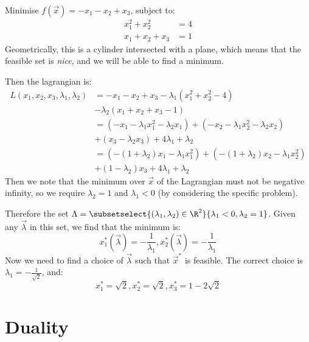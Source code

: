 \documentclass[../Main.tex]{subfiles}
\begin{document}
\begin{example}
    Minimise $f(\vec{x}) = -x_1 - x_2 + x_3$, subject to:
    \begin{align*}
        x_1^2 + x_2^2 &= 4 \\
        x_1 + x_2 + x_3 &= 1
    \end{align*}
    Geometrically, this is a cylinder intersected with a plane, which means that the feasible set is \textit{nice}, and we will be able to find a minimum.

    Then the lagrangian is:
    \begin{align*}
        L(x_1, x_2, x_3, \lambda_1, \lambda_2) &= -x_1 - x_2 + x_3 - \lambda_1(x_1^2 + x_2^2 - 4) \\
        &- \lambda_2(x_1 + x_2 + x_3 - 1) \\
        &= (-x_1 - \lambda_1 x_1^2 - \lambda_2 x_1) + (-x_2 - \lambda_1 x_2^2 - \lambda_2 x_2) \\
        &+(x_3 - \lambda_2 x_3) + 4\lambda_1 + \lambda_2 \\
        &= \left(-(1 + \lambda_2) x_1 - \lambda_1 x_1^2\right) + \left(-(1 + \lambda_2)x_2 - \lambda_1 x_2^2\right)\\
        &+ \left(1 - \lambda_2\right)x_3 + 4\lambda_1 + \lambda_2
    \end{align*}
    Then we note that the minimum over $\vec{x}$ of the Lagrangian must not be negative infinity, so we require $\lambda_2 = 1$ and $\lambda_1 < 0$ (by considering the specific problem).
    
    Therefore the set $\Lambda = \subsetselect{(\lambda_1, \lambda_2) \in \R^2}{\lambda_1 < 0, \lambda_2 = 1}$.
    Given any $\vec{\lambda}$ in this set, we find that the minimum is:
    \begin{equation*}
        x_1^*(\vec{\lambda}) = -\frac{1}{\lambda_1}, x_2^*(\vec{\lambda}) = -\frac{1}{\lambda_1}
    \end{equation*}
    Now we need to find a choice of $\vec{\lambda}$ such that $\vec{x}^*$ is feasible. The correct choice is $\lambda_1 = -\frac{1}{\sqrt{2}}$, and:
    \begin{equation*}
        x_1^* = \sqrt{2}, x_2^* = \sqrt{2}, x_3^* = 1 - 2\sqrt{2}
    \end{equation*}
\end{example}
\section{Duality}
\end{document}
